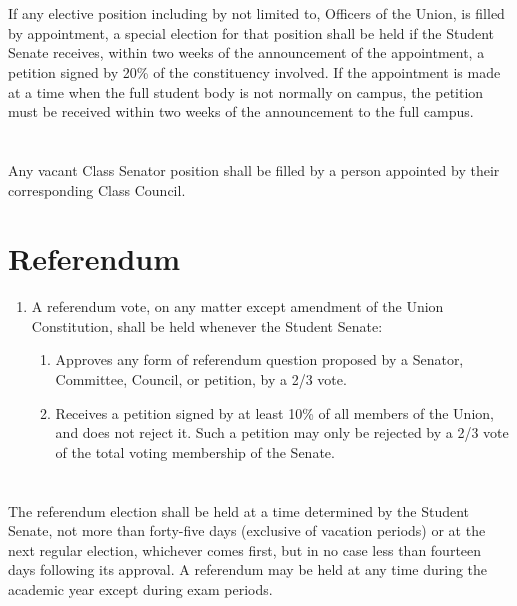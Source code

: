 \documentclass{uniondoc}
\begin{document}
\section{}

If any elective position including by not limited to, Officers of the Union, is filled by appointment, a special election for that position shall be held if the Student Senate receives, within two weeks of the announcement of the appointment, a petition signed by 20\% of the constituency involved. If the appointment is made at a time when the full student body is not normally on campus, the petition must be received within two weeks of the announcement to the full campus.

\section{}

Any vacant Class Senator position shall be filled by a person appointed by their corresponding Class Council.


\section{Referendum}

\begin{enumerate}
	\item A referendum vote, on any matter except amendment of the Union Constitution, shall be held whenever the Student Senate:
	      \begin{enumerate}
		      \item Approves any form of referendum question proposed by a Senator, Committee, Council, or petition, by a 2/3 vote.
		      \item Receives a petition signed by at least 10\% of all members of the Union, and does not reject it. Such a petition may only be rejected by a 2/3 vote of the total voting membership of the Senate.
	      \end{enumerate}
\end{enumerate}

\section{}

The referendum election shall be held at a time determined by the Student Senate, not more than forty-five days (exclusive of vacation periods) or at the next regular election, whichever comes first, but in no case less than fourteen days following its approval. A referendum may be held at any time during the academic year except during exam periods.
\end{document}
